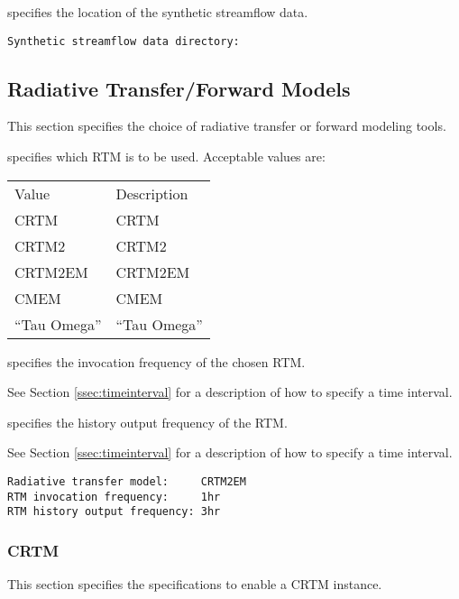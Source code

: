  
  specifies the location
 of the synthetic streamflow data.
 

 \begin{Verbatim}[frame=single]
Synthetic streamflow data directory:
 \end{Verbatim}
 

 
 \subsection{Radiative Transfer/Forward Models} \label{ssec:rtms}
 This section specifies the choice of radiative transfer or forward
 modeling tools.

  specifies which RTM is to be used.
 Acceptable values are:

 \begin{tabular}{ll}
 Value         & Description   \\
 
 CRTM          & CRTM          \\
 CRTM2         & CRTM2         \\
 
 CRTM2EM       & CRTM2EM       \\
 CMEM          & CMEM          \\
 
 ``Tau Omega'' & ``Tau Omega'' \\
 
 \end{tabular}

  specifies the invocation frequency
 of the chosen RTM.

 See Section \ref{ssec:timeinterval} for a description
 of how to specify a time interval.

  specifies the history
 output frequency of the RTM.

 See Section \ref{ssec:timeinterval} for a description
 of how to specify a time interval.
 

 \begin{Verbatim}[frame=single]
Radiative transfer model:     CRTM2EM
RTM invocation frequency:     1hr  
RTM history output frequency: 3hr
 \end{Verbatim}

 
 
 \subsubsection{CRTM} \label{ssec:crtm}
 This section specifies the specifications to enable a CRTM instance.

